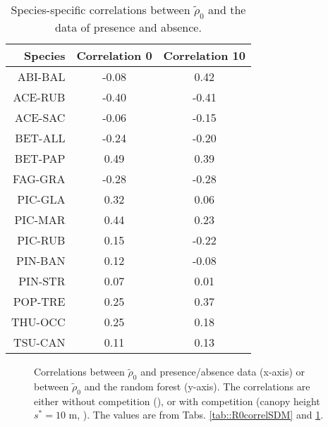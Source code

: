 \documentclass[letterpaper, 12pt]{article}
\newcommand {\s}{{s}^{*}}
\theoremstyle{theo}
\begin{document}
\begin{refsection}
\begin{onehalfspace}
\begin{table}[!h]
\centering
\caption[Correlations $ \tilde \rho_0 $ and presence/absence data]{Species-specific correlations between $ \tilde \rho_0 $ and the data of presence and absence. \label{tab::corr_R0_presAbsData}}
\begin{tabular}{rcc}
	\toprule
	\textbf{Species} & \textbf{Correlation 0} & \textbf{Correlation 10} \\
	\midrule
		ABI-BAL & -0.08 & 0.42 \\
		ACE-RUB & -0.40 & -0.41 \\
		ACE-SAC & -0.06 & -0.15 \\
		BET-ALL & -0.24 & -0.20 \\
		BET-PAP & 0.49 & 0.39 \\
		FAG-GRA & -0.28 & -0.28 \\
		PIC-GLA & 0.32 & 0.06 \\
		PIC-MAR & 0.44 & 0.23 \\
		PIC-RUB & 0.15 & -0.22 \\
		PIN-BAN & 0.12 & -0.08 \\
		PIN-STR & 0.07 & 0.01 \\
		POP-TRE & 0.25 & 0.37 \\
		THU-OCC & 0.25 & 0.18 \\
		TSU-CAN & 0.11 & 0.13 \\
 	\bottomrule
\end{tabular}
\end{table}

\begin{figure}[!h]
	\centering
	
	\caption[$ \text{Cor}(\tilde \rho_0, \text{pres/abs}) $ vs $ \text{Cor}(\tilde \rho_0, \text{SDM}) $]{Correlations between $ \tilde \rho_0 $ and presence/absence data (x-axis) or between $ \tilde \rho_0 $ and the random forest (y-axis). The correlations are either without competition (\MoveUp), or with competition (canopy height $ \s = 10 $ m, \CircSteel). The values are from Tabs. \ref{tab::R0correlSDM} and \ref{tab::corr_R0_presAbsData}. \label{fig::correl_rf_vs_presAbs}}
\end{figure}

\newpage

\end{onehalfspace}
\end{refsection}
\end{document}
